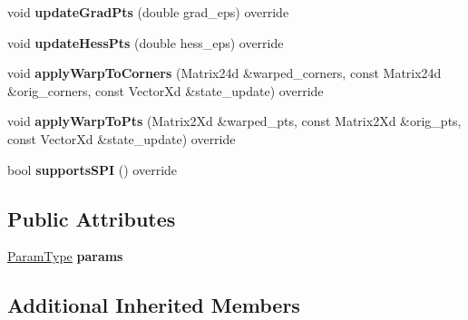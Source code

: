 \begin{DoxyCompactItemize}
\item 
\hypertarget{classTranscaling_a6ba1fc6dcfac63ae943bf3239b00bb07}{void {\bfseries update\-Grad\-Pts} (double grad\-\_\-eps) override}\label{classTranscaling_a6ba1fc6dcfac63ae943bf3239b00bb07}

\item 
\hypertarget{classTranscaling_ae2c2b1612277cce83e3dcf7fc804cab9}{void {\bfseries update\-Hess\-Pts} (double hess\-\_\-eps) override}\label{classTranscaling_ae2c2b1612277cce83e3dcf7fc804cab9}

\item 
\hypertarget{classTranscaling_ab1ff2b9ba17daa477687cac436b9cac0}{void {\bfseries apply\-Warp\-To\-Corners} (Matrix24d \&warped\-\_\-corners, const Matrix24d \&orig\-\_\-corners, const Vector\-Xd \&state\-\_\-update) override}\label{classTranscaling_ab1ff2b9ba17daa477687cac436b9cac0}

\item 
\hypertarget{classTranscaling_ab2edd6291be08365b7efe206194ed05f}{void {\bfseries apply\-Warp\-To\-Pts} (Matrix2\-Xd \&warped\-\_\-pts, const Matrix2\-Xd \&orig\-\_\-pts, const Vector\-Xd \&state\-\_\-update) override}\label{classTranscaling_ab2edd6291be08365b7efe206194ed05f}

\item 
\hypertarget{classTranscaling_a21d28dc7b8e109a64c2cdd24e065bfb2}{bool {\bfseries supports\-S\-P\-I} () override}\label{classTranscaling_a21d28dc7b8e109a64c2cdd24e065bfb2}

\end{DoxyCompactItemize}
\subsection*{Public Attributes}
\begin{DoxyCompactItemize}
\item 
\hypertarget{classTranscaling_ad7fc78cc5cc2361316876b6b4eacd528}{\hyperlink{structTranscalingParams}{Param\-Type} {\bfseries params}}\label{classTranscaling_ad7fc78cc5cc2361316876b6b4eacd528}

\end{DoxyCompactItemize}
\subsection*{Additional Inherited Members}


